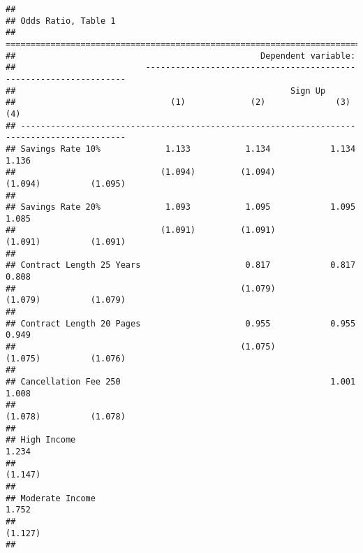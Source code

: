 \documentclass[
]{article}
\begin{document}
\begin{verbatim}
## 
## Odds Ratio, Table 1
## ===========================================================================================
##                                                 Dependent variable:                        
##                          ------------------------------------------------------------------
##                                                       Sign Up                              
##                               (1)             (2)              (3)              (4)        
## -------------------------------------------------------------------------------------------
## Savings Rate 10%             1.133           1.134            1.134            1.136       
##                             (1.094)         (1.094)          (1.094)          (1.095)      
##                                                                                            
## Savings Rate 20%             1.093           1.095            1.095            1.085       
##                             (1.091)         (1.091)          (1.091)          (1.091)      
##                                                                                            
## Contract Length 25 Years                     0.817            0.817            0.808       
##                                             (1.079)          (1.079)          (1.079)      
##                                                                                            
## Contract Length 20 Pages                     0.955            0.955            0.949       
##                                             (1.075)          (1.075)          (1.076)      
##                                                                                            
## Cancellation Fee 250                                          1.001            1.008       
##                                                              (1.078)          (1.078)      
##                                                                                            
## High Income                                                                    1.234       
##                                                                               (1.147)      
##                                                                                            
## Moderate Income                                                                1.752       
##                                                                               (1.127)      
##                                                                                            

\end{verbatim}
\end{document}
